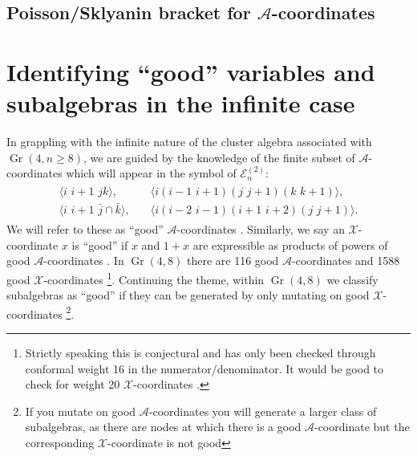 \documentclass[11pt]{article}
\DeclareMathOperator{\Gr}{Gr}
\def\ket#1{\langle #1 \rangle}
\def\xcoord{$\mathcal{X}$-coordinate }
\def\xcoords{$\mathcal{X}$-coordinates }
\def\a{\mathcal{A}}
\def\acoord{$\mathcal{A}$-coordinate }
\def\acoords{$\mathcal{A}$-coordinates }
\def\flag{{\huge \color{red} \textinterrobang}}
\def\pdfeq#1{\texorpdfstring{$#1$}{a}}
\begin{document}
\subsection{Poisson/Sklyanin bracket for \pdfeq{\a}-coordinates}

\section{Identifying ``good'' variables and subalgebras in the infinite case}

In grappling with the infinite nature of the cluster algebra associated with $\Gr(4,n\ge8)$, we are guided by the knowledge of the finite subset of \acoords which will appear in the symbol of $\mathcal{E}^{(2)}_n$\cite{CaronHuot:2011ky}: 
\begin{align}\label{def:good-letters}
\begin{split}
\ket{i\,\,i{+}1\,\,jk},& \quad 
\ket{i(i{-}1\,\,i{+}1)(j\,\,j{+}1)(k\,\,k{+}1)}, \\ 
\ket{i\,\,i{+}1\,\,\bar{j}\cap\bar{k}},& \quad
\ket{i(i{-}2\,\,i{-}1)(i{+}1\,\,i{+}2)(j\,\,j{+}1)}.
\end{split}
\end{align}
We will refer to these as ``good'' \acoords. Similarly, we say an \xcoord $x$ is ``good'' if $x$ and $1+x$ are expressible as products of powers of good \acoords. In $\Gr(4,8)$ there are 116 good \acoords and 1588 good \xcoords \flag \footnote{Strictly speaking this is conjectural and has only been checked through conformal weight 16 in the numerator/denominator. It would be good to check for weight 20 \xcoords.}. Continuing the theme, within $\Gr(4,8)$ we classify subalgebras as ``good'' if they can be generated by only mutating on good \xcoords\footnote{If you mutate on good \acoords you will generate a larger class of subalgebras, as there are nodes at which there is a good \acoord but the corresponding \xcoord is not good}.
\end{document}
